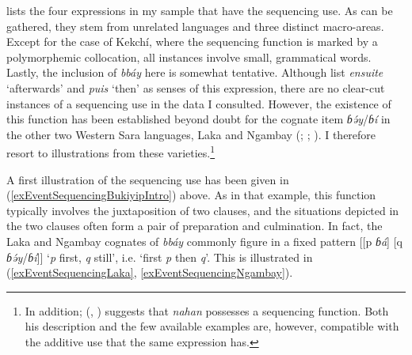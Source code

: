  lists the four expressions in my sample that have the sequencing use. As can be gathered, they stem from unrelated languages and three distinct macro-areas. Except for the case of Kekchí, where the sequencing function is marked by a polymorphemic collocation, all instances involve small, grammatical words. Lastly, the inclusion of  \textit{bbáy} here is somewhat tentative. Although \textcite[310, 407]{MoserDingatoloum2007} list \textit{ensuite} \lq afterwards' and \textit{puis} \lq then' as senses of this expression, there are no clear-cut instances of a sequencing use in the data I consulted. However, the existence of this function has been established beyond doubt for the cognate item \textit{ɓə́y}/\textit{ɓí} in the other two Western Sara languages, Laka and Ngambay (\cite[130]{Keegan2014}; \cite[108, 114]{Thayer1978}; \cite[119, 138]{Vandame1963}). I therefore resort to illustrations from these varieties.\footnote{In addition; \citeauthor{Huang2007} (\citeyear{Huang2007}, \citeyear[114–116]{Huang2008}) suggests that  \textit{nahan} possesses a sequencing function. Both his description and the few available examples are, however, compatible with the additive use that the same expression has.}

\begin{table}
	\caption{Event sequencing\label{tableEventSequencing}}
\end{table}

 A first illustration of the sequencing use has been given in (\ref{exEventSequencingBukiyipIntro}) above. As in that example, this function typically involves the juxtaposition of two clauses, and the situations depicted in the two clauses often form a pair of preparation and culmination. In fact, the Laka and Ngambay cognates of  \textit{bbáy} commonly figure in a fixed pattern [[p \textit{ɓá}] [q \textit{ɓə́y}\textup{/}\textit{ɓí}]] \lq \textit{p} first, \textit{q} still\rq{}, i.e. \lq{}first \textit{p} then \textit{q}\rq{}. This is illustrated in (\ref{exEventSequencingLaka}, \ref{exEventSequencingNgambay}).

